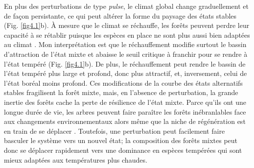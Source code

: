 En plus des perturbations de type \emph{pulse}, le climat global change
graduellement et de façon persistante, ce qui peut altérer la forme du
paysage des états stables (Fig. \ref{fig4.1}b). À mesure que le climat
se réchauffe, les forêts peuvent perdre leur capacité à se rétablir
puisque les espèces en place ne sont plus aussi bien adaptées au climat
\citep{johnstone_changing_2016}. Mon interprétation est que le
réchauffement modifie surtout le bassin d'attraction de l'état mixte et
abaisse le seuil critique à franchir pour se rendre à l'état tempéré
(Fig. \ref{fig4.1}b). De plus, le réchauffement peut rendre le bassin de
l'état tempéré plus large et profond, donc plus attractif, et,
inversement, celui de l'état boréal moins profond. Ces modifications de
la courbe des états alternatifs stables fragilisent la forêt mixte,
mais, en l'absence de perturbation, la grande inertie des forêts cache
la perte de résilience de l'état mixte. Parce qu'ils ont une longue
durée de vie, les arbres peuvent faire paraître les forêts inébranlables
face aux changements environnementaux alors même que la niche de
régénération est en train de se déplacer
\citep{boisvertmarsh_divergent_2019, sittaro_tree_2017}. Toutefois, une
perturbation peut facilement faire basculer le système vers un nouvel
état; la composition des forêts mixtes peut donc se déplacer rapidement
vers une dominance en espèces tempérées qui sont mieux adaptées aux
températures plus chaudes.

\newpage

